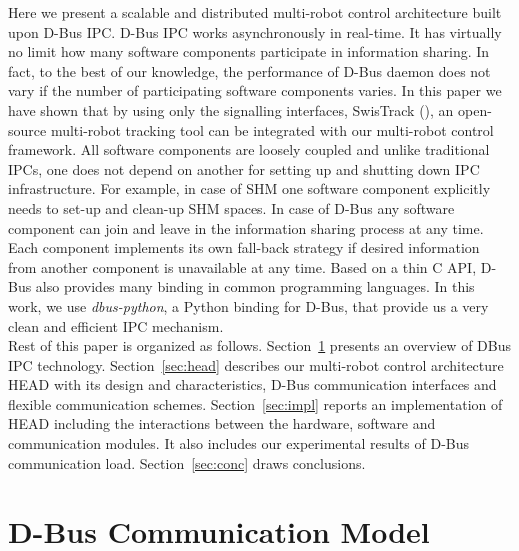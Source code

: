 \documentclass{ifacconf}
\begin{document}
Here we present a scalable and distributed multi-robot control architecture built upon D-Bus IPC. D-Bus IPC works asynchronously in real-time. It has virtually no limit how many software components participate in information sharing. In fact, to the best of our knowledge, the performance of D-Bus daemon does not vary if the number of participating software components varies. In this paper we have shown that by using only the signalling interfaces, SwisTrack (\cite{Lochmatter+2008}), an open-source multi-robot tracking tool can be integrated with our multi-robot control framework. All software components are loosely coupled and unlike traditional IPCs, one does not depend on another for setting up and shutting down IPC infrastructure. For example, in case of SHM one software component explicitly needs to set-up and clean-up SHM spaces. In case of D-Bus any software component can join and leave in the information sharing process at any time. Each component implements its own fall-back strategy if desired information from another component is unavailable at any time. Based on a thin C API, D-Bus also provides many binding in common programming languages. In this work, we use {\em dbus-python}, a Python binding for D-Bus, that provide us a very clean and efficient IPC mechanism.\\
Rest of this paper is organized as follows. Section~\ref{sec:dbus} presents an overview of DBus IPC technology.  Section~\ref{sec:head} describes our multi-robot control architecture HEAD with its design and characteristics, D-Bus communication interfaces and flexible communication schemes.  Section~\ref{sec:impl} reports an implementation of HEAD including the interactions between the hardware, software and communication modules. It also includes  our experimental results of D-Bus communication load. Section~\ref{sec:conc} draws conclusions.
\section{D-Bus Communication Model}
\label{sec:dbus}
\end{document}
